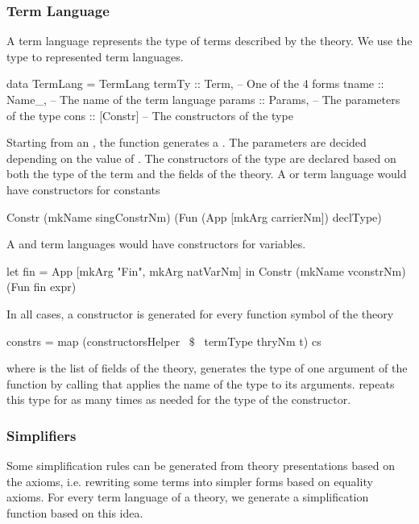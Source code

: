 \subsubsection{Term Language}
\label{subsec:term_lang}
A term language represents the type of terms described by the theory. We use the  type to represented term languages.  
\begin{hscode}
data TermLang = TermLang {
  termTy  :: Term,    -- One of the 4 forms 
  tname   :: Name_,   -- The name of the term language 
  params  :: Params,  -- The parameters of the type 
  cons    :: [Constr] -- The constructors of the type 
}
\end{hscode}
Starting from an , the function  generates a . The parameters are decided depending on the value of . The constructors of the type are declared based on both the type of the term and the fields of the theory. A  or  term language would have constructors for constants
\begin{hscode} 
Constr (mkName singConstrNm)
    (Fun (App [mkArg carrierNm]) declType)
\end{hscode} 
\noindent A  and  term languages would have constructors for variables. 
\begin{hscode} 
 let fin = App [mkArg "Fin", mkArg natVarNm]
 in Constr (mkName vconstrNm) (Fun fin expr) 
\end{hscode} 
\noindent In all cases, a constructor is generated for every function symbol of the theory 
\begin{hscode} 
constrs = map (constructorsHelper ~$\$$~ termType thryNm t) cs
\end{hscode} 
\noindent where  is the list of fields of the theory, 
  generates the type of one argument of the function by calling  that applies the name of the type to its arguments.
 repeats this type for as many times as needed for the type of the constructor. 

\subsubsection{Simplifiers}
\label{sec:generation:simplifier}
Some simplification rules can be generated from theory presentations based on the axioms, i.e. rewriting some terms into simpler forms based on equality axioms. For every term language of a theory, we generate a simplification function based on this idea. 

